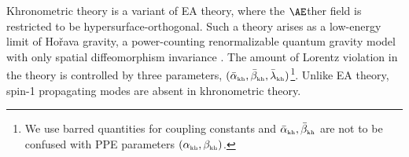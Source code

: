 \documentclass[prd,twocolumn,nofootinbib]{revtex4-1}
\newcommand{\KG}{{\mbox{\tiny kh}}}
\begin{document}
 
 
Khronometric theory is a variant of EA theory, where the $\AE$ther field is restricted to be hypersurface-orthogonal. Such a theory arises as a low-energy limit of Ho\v{r}ava gravity, a power-counting renormalizable quantum gravity model with only spatial diffeomorphism invariance \cite{Blas:2009qj,Berti:2015itd,Horava:2009uw,Nishioka:2009iq,Visser:2009fg}. The amount of Lorentz violation in the theory is controlled by three parameters, $(\bar \alpha_{\KG}, \bar \beta_{\KG}, \bar \lambda_{\KG})$\footnote{We use barred quantities for coupling constants and $\bar \alpha_{\KG}, \bar \beta_{\KG}$ are not to be confused with PPE parameters $(\alpha_{\KG}, \beta_{\KG})$.}. Unlike EA theory, spin-1 propagating modes are absent in khronometric theory.

\end{document}
